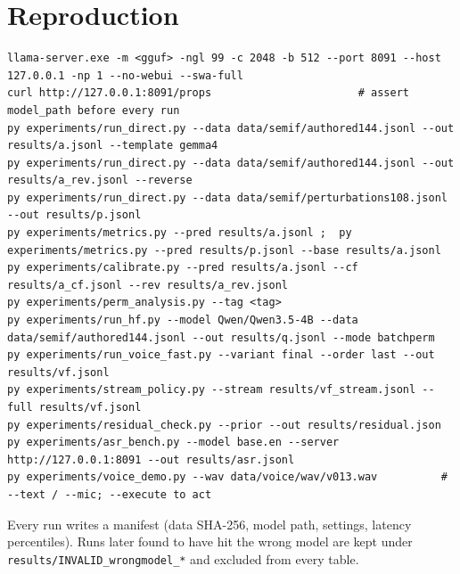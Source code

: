 \documentclass[11pt,a4paper]{article}
\newcommand{\code}[1]{\texttt{#1}}
\begin{document}
\section{Reproduction}
\begin{small}
\begin{verbatim}
llama-server.exe -m <gguf> -ngl 99 -c 2048 -b 512 --port 8091 --host 127.0.0.1 -np 1 --no-webui --swa-full
curl http://127.0.0.1:8091/props                       # assert model_path before every run
py experiments/run_direct.py --data data/semif/authored144.jsonl --out results/a.jsonl --template gemma4
py experiments/run_direct.py --data data/semif/authored144.jsonl --out results/a_rev.jsonl --reverse
py experiments/run_direct.py --data data/semif/perturbations108.jsonl --out results/p.jsonl
py experiments/metrics.py --pred results/a.jsonl ;  py experiments/metrics.py --pred results/p.jsonl --base results/a.jsonl
py experiments/calibrate.py --pred results/a.jsonl --cf results/a_cf.jsonl --rev results/a_rev.jsonl
py experiments/perm_analysis.py --tag <tag>
py experiments/run_hf.py --model Qwen/Qwen3.5-4B --data data/semif/authored144.jsonl --out results/q.jsonl --mode batchperm
py experiments/run_voice_fast.py --variant final --order last --out results/vf.jsonl
py experiments/stream_policy.py --stream results/vf_stream.jsonl --full results/vf.jsonl
py experiments/residual_check.py --prior --out results/residual.json
py experiments/asr_bench.py --model base.en --server http://127.0.0.1:8091 --out results/asr.jsonl
py experiments/voice_demo.py --wav data/voice/wav/v013.wav          # --text / --mic; --execute to act
\end{verbatim}
\end{small}
Every run writes a manifest (data SHA-256, model path, settings, latency percentiles). Runs later found to have hit the wrong model are kept under \code{results/INVALID\_wrongmodel\_*} and excluded from every table.
\end{document}
